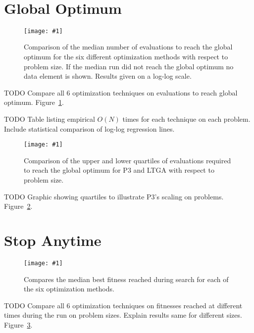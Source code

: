 \documentclass[twoside]{article}
\newcommand{\includegraphicsfit}[1]
{\texttt{[image: \#1]}}
\begin{document}
~\cite{jovanovic:1997:ruleofthree}

\section{Global Optimum}
\label{sec-optimum}

\begin{figure}[t]
  \begin{center}
  \includegraphicsfit{evals-to-success}
  \end{center}
  \caption{Comparison of the median number of evaluations to reach the global optimum for
           the six different optimization methods with respect
           to problem size.  If the median run did not reach the global optimum no data element
           is shown.  Results given on a log-log scale.}
  \label{fig-evals-to-success}
\end{figure}

TODO Compare all 6 optimization techniques on evaluations to reach global optimum.  Figure~\ref{fig-evals-to-success}.

TODO Table listing empirical $O(N)$ times for each technique on each problem. Include
statistical comparison of log-log regression lines.

\begin{figure}[t]
  \begin{center}
  \includegraphicsfit{evals-to-success-range}
  \end{center}
  \caption{Comparison of the upper and lower quartiles of evaluations required
           to reach the global optimum for P3 and LTGA with respect to problem size.}
  \label{fig-evals-to-success-range}
\end{figure}

TODO Graphic showing quartiles to illustrate P3's scaling on problems. Figure~\ref{fig-evals-to-success-range}.

\section{Stop Anytime}
\begin{figure}[t]
  \begin{center}
  \includegraphicsfit{fitness-over-time}
  \end{center}
  \caption{Compares the median best fitness reached during search for each of the six optimization methods.}
  \label{fig-fitness-over-time}
\end{figure}

TODO Compare all 6 optimization techniques on fitnesses reached at different times
during the run on problem sizes. Explain results same for different sizes. Figure~\ref{fig-fitness-over-time}.
\end{document}
